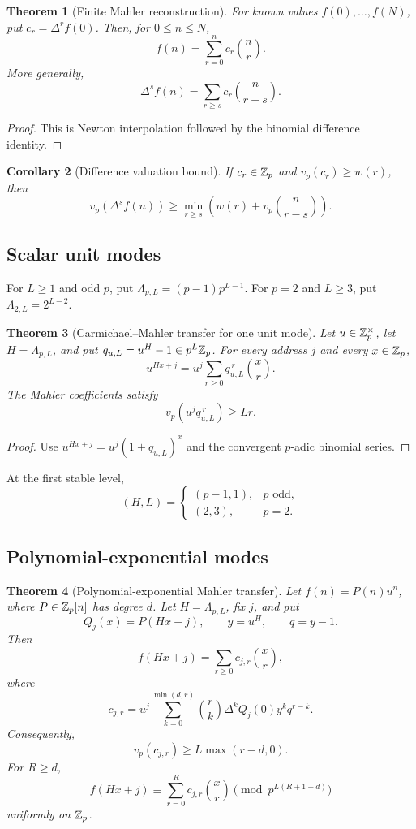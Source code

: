 \documentclass[11pt]{article}
\newtheorem{theorem}{Theorem}[section]\newtheorem{proposition}[theorem]{Proposition}\newtheorem{lemma}[theorem]{Lemma}\newtheorem{corollary}[theorem]{Corollary}
\theoremstyle{definition}\newtheorem{definition}[theorem]{Definition}\newtheorem{example}[theorem]{Example}\newtheorem{construction}[theorem]{Construction}\newtheorem{algorithm}[theorem]{Algorithm}\newtheorem{conjecture}[theorem]{Conjecture}\newtheorem{problem}[theorem]{Problem}
\theoremstyle{remark}\newtheorem{remark}[theorem]{Remark}\newtheorem{boundary}[theorem]{Boundary}\newtheorem{certificate}[theorem]{Computational Certificate}\newtheorem{classical}[theorem]{Classical Input}\newtheorem{principle}[theorem]{Structural Principle}
\begin{document}
\begin{theorem}[Finite Mahler reconstruction]
For known values $f(0),\ldots,f(N)$, put $c_r=\Delta^rf(0)$. Then, for $0\leq n\leq N$,
\[
 \boxed{f(n)=\sum_{r=0}^{n}c_r\binom nr.}
\]
More generally,
\[
 \boxed{\Delta^sf(n)=\sum_{r\geq s}c_r\binom n{r-s}.}
\]
\end{theorem}

\begin{proof}
This is Newton interpolation followed by the binomial difference identity.
\end{proof}

\begin{corollary}[Difference valuation bound]
If $c_r\in\mathbb Z_p$ and $v_p(c_r)\geq w(r)$, then
\[
 \boxed{v_p(\Delta^sf(n))\geq\min_{r\geq s}\left(w(r)+v_p\binom n{r-s}\right).}
\]
\end{corollary}

\subsection{Scalar unit modes}
For $L\geq1$ and odd $p$, put $\Lambda_{p,L}=(p-1)p^{L-1}$. For $p=2$ and $L\geq3$, put $\Lambda_{2,L}=2^{L-2}$.

\begin{theorem}[Carmichael--Mahler transfer for one unit mode]
Let $u\in\mathbb Z_p^\times$, let $H=\Lambda_{p,L}$, and put $q_{u,L}=u^H-1\in p^L\mathbb Z_p$. For every address $j$ and every $x\in\mathbb Z_p$,
\[
 \boxed{u^{Hx+j}=u^j\sum_{r\geq0}q_{u,L}^{\,r}\binom xr.}
\]
The Mahler coefficients satisfy
\[
 \boxed{v_p\left(u^jq_{u,L}^{\,r}\right)\geq Lr.}
\]
\end{theorem}

\begin{proof}
Use $u^{Hx+j}=u^j(1+q_{u,L})^x$ and the convergent $p$-adic binomial series.
\end{proof}

At the first stable level,
\[
 (H,L)=\begin{cases}(p-1,1),&p\text{ odd},\\(2,3),&p=2.\end{cases}
\]

\subsection{Polynomial-exponential modes}
\begin{theorem}[Polynomial-exponential Mahler transfer]
Let $f(n)=P(n)u^n$, where $P\in\mathbb Z_p[n]$ has degree $d$. Let $H=\Lambda_{p,L}$, fix $j$, and put
\[
 Q_j(x)=P(Hx+j),\qquad y=u^H,\qquad q=y-1.
\]
Then
\[
 f(Hx+j)=\sum_{r\geq0}c_{j,r}\binom xr,
\]
where
\[
 \boxed{c_{j,r}=u^j\sum_{k=0}^{\min(d,r)}\binom rk\Delta^kQ_j(0)y^kq^{r-k}.}
\]
Consequently,
\[
 \boxed{v_p(c_{j,r})\geq L\max(r-d,0).}
\]
For $R\geq d$,
\[
 \boxed{f(Hx+j)\equiv\sum_{r=0}^{R}c_{j,r}\binom xr\pmod{p^{L(R+1-d)}}}
\]
uniformly on $\mathbb Z_p$.
\end{theorem}
\end{document}
